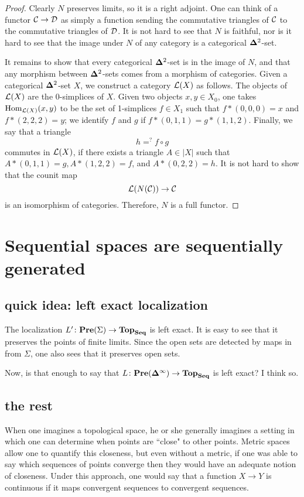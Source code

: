 \documentclass{amsart}
\def\Seq{{\bf Seq}}
\def\Del{{\bf \Delta}}
\def\Delinf{{\Del^\infty}}
\begin{document}
\begin{proof}

Clearly $N$ preserves limits, so it is a right adjoint.  One can think of a functor $\mathcal{C}\rightarrow\mathcal{D}$ as simply a function sending the commutative triangles of $\mathcal{C}$ to the commutative triangles of $\mathcal{D}$.  It is not hard to see that $N$ is faithful, nor is it hard to see that the image under $N$ of any category is a categorical $\Del^2$-set.

It remains to show that every categorical $\Del^2$-set is in the image of $N$, and that any morphism between $\Del^2$-sets comes from a morphism of categories.  Given a categorical $\Del^2$-set $X$, we construct a category $\mathcal{L}(X)$ as follows.  The objects of $\mathcal{L}(X)$ are the 0-simplices of $X$.  Given two objects $x,y\in X_0$, one takes $\textnormal{Hom}_{\mathcal{L}(X)}(x,y)$ to be the set of 1-simplices $f\in X_1$ such that $f*(0,0,0)=x$ and $f*(2,2,2)=y$; we identify $f$ and $g$ if $f*(0,1,1)=g*(1,1,2)$.  Finally, we say that a triangle $$h=^?f\circ g$$ commutes in $\mathcal{L}(X)$, if there exists a triangle $A\in|X|$ such that $A*(0,1,1)=g, A*(1,2,2)=f$, and $A*(0,2,2)=h$.  It is not hard to show that the counit map $$\mathcal{L}(N(\mathcal{C}))\rightarrow\mathcal{C}$$ is an isomorphism of categories.  Therefore, $N$ is a full functor.

\end{proof}

\section{Sequential spaces are sequentially generated}

\subsection{quick idea: left exact localization}

The localization $L'\taking\Pre(\Sigma)\to\Top_\Seq$ is left exact. It is easy to see that it preserves the points of finite limits.  Since the open sets are detected by maps in from $\Sigma$, one also sees that it preserves open sets.

Now, is that enough to say that $L\taking\Pre(\Delinf)\to\Top_\Seq$ is left exact?  I think so.

\subsection{the rest}

When one imagines a topological space, he or she generally imagines a setting in which one can determine when points are ``close" to other points.  Metric spaces allow one to quantify this closeness, but even without a metric, if one was able to say which sequences of points converge then they would have an adequate notion of closeness.  Under this approach, one would say that a function $X\to Y$ is continuous if it maps convergent sequences to convergent sequences.  
\end{document}
